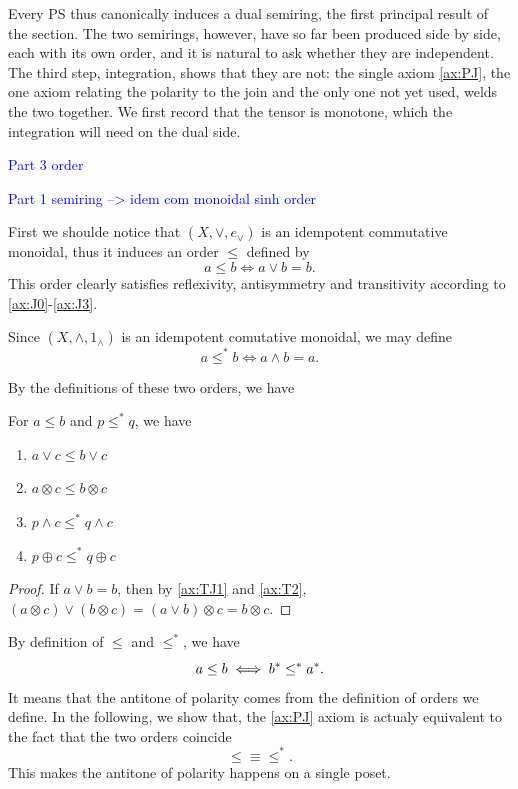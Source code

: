 Every PS thus canonically induces a dual semiring, the first principal result
of the section. The two semirings, however, have so far been produced side by
side, each with its own order, and it is natural to ask whether they are
independent. The third step, integration, shows that they are not: the single
axiom \eqref{ax:PJ}, the one axiom relating the polarity to the join and the
only one not yet used, welds the two together. We first record that the
tensor is monotone, which the integration will need on the dual side.



\textcolor{blue}{Part 3 order}

\textcolor{blue}{Part 1 semiring --> idem com monoidal sinh order}

First we shoulde notice that $(X, \vee, e_\vee)$ is an idempotent commutative monoidal, thus it induces an order $\leq$ defined by 
\begin{equation*}
    a \leq b \Leftrightarrow a \vee b = b.
\end{equation*}
This order clearly satisfies reflexivity, antisymmetry and transitivity according to \eqref{ax:J0}-\eqref{ax:J3}.

Since $(X, \wedge,1_\wedge)$ is an idempotent comutative monoidal, we may define 
\begin{equation*}
    a \leq^* b \Leftrightarrow a \wedge b = a.
\end{equation*}

By the definitions of these two orders, we have 
\begin{lemma}\label{lem:tensor-monotone}
For $a \leq b$ and $p\leq^* q$, we have
\begin{enumerate}
    \item $a \vee c \leq b \vee c$
    \item $a \otimes c \leq b \otimes c$
    \item $p \wedge c \leq^* q \wedge c$
    \item $p \oplus c \leq^* q \oplus c$
\end{enumerate}
\end{lemma}

\begin{proof}
If $a \vee b = b$, then by \eqref{ax:TJ1} and \eqref{ax:T2},
$(a \otimes c) \vee (b \otimes c) = (a \vee b) \otimes c = b \otimes c$.
\end{proof}

By definition of $\leq$ and $\leq^*$, we have 
$$a \leq b \iff {b}^{*} \leq^{*} {a}^{*}.$$
It means that the antitone of polarity comes from the definition of orders we define.
In the following, we show that, the \eqref{ax:PJ} axiom is actualy equivalent to the fact that the two orders coincide
$$\leq \equiv \leq^*.$$
This makes the antitone of polarity happens on a single poset.

